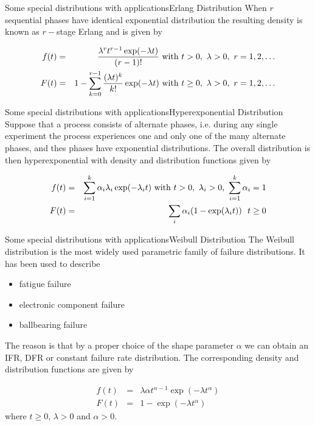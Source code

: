 \documentclass[handout]{beamer}
\begin{document}
\begin{frame}{Some special distributions with applications}{Erlang Distribution}
When $r$ sequential phases have identical exponential distribution the resulting density is known as
$r-$stage Erlang and is given by

 \begin{eqnarray*}
f(t) &=& \frac{\lambda ^r t ^{r-1}  \exp(-\lambda t)}{(r-1)!}  \textnormal{ with } t>0, \ \lambda > 0, \ r=1,2,\dots \\ 
F(t) &=& 1 - \sum_{k=0}^{r-1} \frac{(\lambda t)^k}{k!} \exp(- \lambda t) \textnormal{ with } t \geq 0, \ \lambda > 0, \ r=1,2,\dots 
 \end{eqnarray*}

\end{frame}


\begin{frame}{Some special distributions with applications}{Hyperexponential Distribution}
Suppose that a process consists of alternate phases, i.e. during any single experiment the process 
experiences one and only one of the many alternate phases, and thes phases have exponential distributions.
The overall distribution is then hyperexponential with density and distribution functions given by

 \begin{eqnarray*}
f(t) &=& \sum_{i=1}^k \alpha_i \lambda_i \exp(-\lambda_i t)  \textnormal{ with } t>0, \ \lambda_i > 0, \ \sum_{i=1}^{k}\alpha_i=1\\ 
F(t) &=& \sum _i \alpha_i (1-\exp(\lambda_i t)) \ \ t \geq 0
 \end{eqnarray*}

\end{frame}


\begin{frame}{Some special distributions with applications}{Weibull Distribution}
The Weibull distribution is the most widely used parametric family of failure distributions. It has been used to describe
\begin{itemize}
 \item fatigue failure
 \item electronic component failure
 \item ballbearing failure
\end{itemize}
The reason is that by a proper choice of the shape parameter $\alpha$ we can obtain an IFR, DFR or constant failure rate 
distribution. The corresponding density and distribution functions are given by

 \begin{eqnarray*}
f(t) &=& \lambda \alpha t^{\alpha -1} \exp(-\lambda t ^\alpha)\\ 
F(t) &=&  1 - \exp(-\lambda t ^\alpha)
 \end{eqnarray*}
where $t \geq 0$, $\lambda > 0$ and $\alpha > 0$.
\end{frame}
\end{document}
